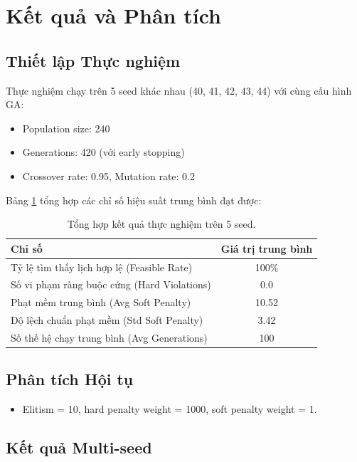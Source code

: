 \section{Kết quả và Phân tích}

\subsection{Thiết lập Thực nghiệm}
Thực nghiệm chạy trên 5 seed khác nhau (40, 41, 42, 43, 44) với cùng cấu hình GA:
\begin{itemize}
    \item Population size: 240
    \item Generations: 420 (với early stopping)
    \item Crossover rate: 0.95, Mutation rate: 0.2
\end{itemize}

Bảng \ref{tab:summary_results} tổng hợp các chỉ số hiệu suất trung bình đạt được:

\begin{table}[H]
    \centering
    \begin{tabular}{|l|c|}
    \hline
    \textbf{Chỉ số} & \textbf{Giá trị trung bình} \\ \hline
    Tỷ lệ tìm thấy lịch hợp lệ (Feasible Rate) & 100\% \\ \hline
    Số vi phạm ràng buộc cứng (Hard Violations) & 0.0 \\ \hline
    Phạt mềm trung bình (Avg Soft Penalty) & 10.52 \\ \hline
    Độ lệch chuẩn phạt mềm (Std Soft Penalty) & 3.42 \\ \hline
    Số thế hệ chạy trung bình (Avg Generations) & 100 \\ \hline
    \end{tabular}
    \caption{Tổng hợp kết quả thực nghiệm trên 5 seed.}
    \label{tab:summary_results}
\end{table}

\subsection{Phân tích Hội tụ}
\begin{itemize}
    \item Elitism = 10, hard penalty weight = 1000, soft penalty weight = 1.
\end{itemize}

\subsection{Kết quả Multi-seed}

